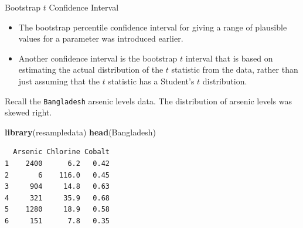 \documentclass[
  ignorenonframetext,
]{beamer}
\newenvironment{Shaded}{\begin{snugshade}}{\end{snugshade}}
\newcommand{\FunctionTok}[1]{\textcolor[rgb]{0.13,0.29,0.53}{\textbf{#1}}}
\newcommand{\NormalTok}[1]{#1}
\begin{document}
\begin{frame}[fragile]{Bootstrap \(t\) Confidence Interval}
\protect\hypertarget{bootstrap-t-confidence-interval-1}{}
\begin{itemize}
\item
  The bootstrap percentile confidence interval for giving a range of
  plausible values for a parameter was introduced earlier.
\item
  Another confidence interval is the bootstrap \(t\) interval that is
  based on estimating the actual distribution of the \(t\) statistic
  from the data, rather than just assuming that the \(t\) statistic has
  a Student's \(t\) distribution.
\end{itemize}

Recall the \texttt{Bangladesh} arsenic levels data. The distribution of
arsenic levels was skewed right.

\tiny

\begin{Shaded}
\begin{Highlighting}[]
\FunctionTok{library}\NormalTok{(resampledata)}
\FunctionTok{head}\NormalTok{(Bangladesh)}
\end{Highlighting}
\end{Shaded}

\begin{verbatim}
  Arsenic Chlorine Cobalt
1    2400      6.2   0.42
2       6    116.0   0.45
3     904     14.8   0.63
4     321     35.9   0.68
5    1280     18.9   0.58
6     151      7.8   0.35
\end{verbatim}

\normalsize
\end{frame}
\end{document}
